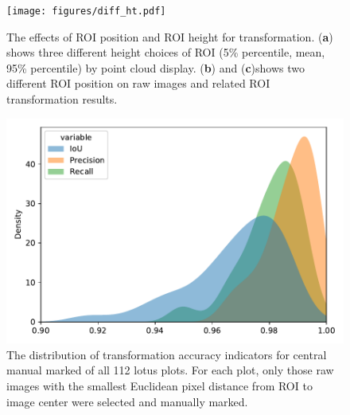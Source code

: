 \documentclass{configs/bmcart}
\begin{document}
\begin{backmatter}
\begin{figure}[!htb]
  \texttt{[image: figures/diff\_ht.pdf]}
  \caption{The effects of ROI position and ROI height for transformation. (\textbf{a}) shows three different height choices of ROI (5\% percentile, mean, 95\% percentile) by point cloud display. (\textbf{b}) and (\textbf{c})shows two different ROI position on raw images and related ROI transformation results.}
  \label{fig:ht_diff}
\end{figure}

\begin{figure}[!htb]
  \includegraphics[width=0.95\linewidth]{figures/iou_all.pdf}
  \caption{The distribution of transformation accuracy indicators for central manual marked of all 112 lotus plots. For each plot, only those raw images with the smallest Euclidean pixel distance from ROI to image center were selected and manually marked.}
  \label{fig:iou_all}
\end{figure}

\end{backmatter}
\end{document}
